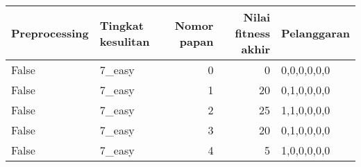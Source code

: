 \begin{tabular}{llrrl}
\hline
 Preprocessing   & Tingkat kesulitan   &   Nomor papan &   Nilai fitness akhir & Pelanggaran   \\
\hline
 False           & 7\_easy              &             0 &                     0 & 0,0,0,0,0,0   \\
 False           & 7\_easy              &             1 &                    20 & 0,1,0,0,0,0   \\
 False           & 7\_easy              &             2 &                    25 & 1,1,0,0,0,0   \\
 False           & 7\_easy              &             3 &                    20 & 0,1,0,0,0,0   \\
 False           & 7\_easy              &             4 &                     5 & 1,0,0,0,0,0   \\
\hline
\end{tabular}